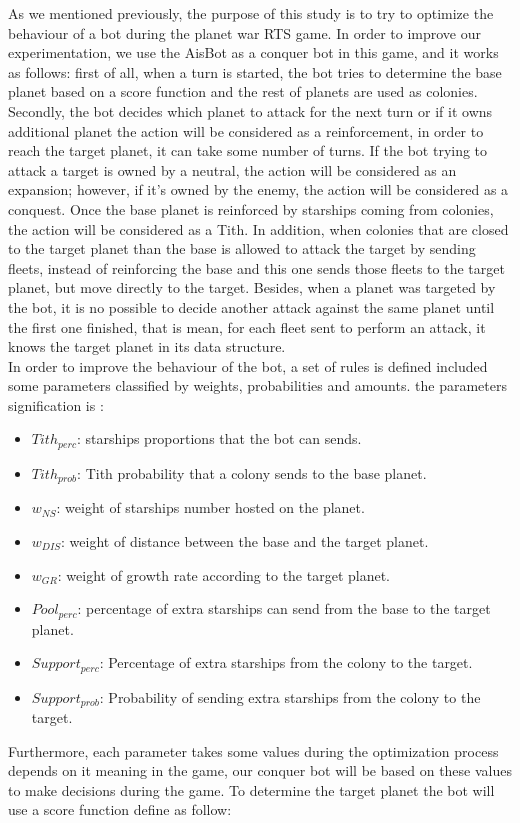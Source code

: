 \documentclass[conference]{IEEEtran}
\begin{document}


As we mentioned previously, the purpose of this study is to try to optimize the behaviour of a bot during the planet war RTS game. In order to improve our experimentation, we use the AisBot as a conquer bot in this game, and it works as follows: first of all, when a turn is started, the bot tries to determine the base planet based on a score function and the rest of planets are used as colonies. Secondly, the bot decides which planet to attack for the next turn or if it owns additional planet the action will be considered as a reinforcement, in order to reach the target planet, it can take some number of turns. If the bot trying to attack a target is owned by a neutral, the action will be considered as an expansion; however, if it's owned by the enemy, the action will be considered as a conquest. Once the base planet is reinforced by starships coming from colonies, the action will be considered as a Tith. In addition, when colonies that are closed to the target planet than the base is allowed to attack the target by sending fleets, instead of reinforcing the base and this one sends those fleets to the target planet, but move directly to the target. Besides, when a planet was targeted by the bot, it is no possible to decide another attack against the same planet until the first one finished, that is mean, for each fleet sent to perform an attack, it knows the target planet in its data structure. \\





In order to improve the behaviour of the bot,  a set of rules is defined included some parameters classified by weights, probabilities and amounts. the parameters signification is : 
\begin{itemize}
\item \textit{$Tith_{perc}$}: starships proportions that the bot can sends.
\item \textit{$Tith_{prob}$}: Tith probability that a colony sends to the base planet.
\item \textit{$w_{NS}$}: weight of starships number hosted on the planet.
\item \textit{$w_{DIS}$}: weight of distance between the base and the target planet.
\item \textit{$w_{GR}$}: weight of growth rate according to the target planet.
\item \textit{$Pool_{perc}$}: percentage of extra starships can send from the base to the target planet.
\item \textit{$Support_{perc}$}: Percentage of extra starships from the colony to the target.
\item \textit{$Support_{prob}$}: Probability of sending extra starships from the colony to the target.
\end{itemize}
Furthermore, each parameter takes some values during the optimization process depends on it meaning in the game, our conquer bot will be based on these values to make decisions during the game. To determine the target planet the bot will use a score function define as follow:
\end{document}
